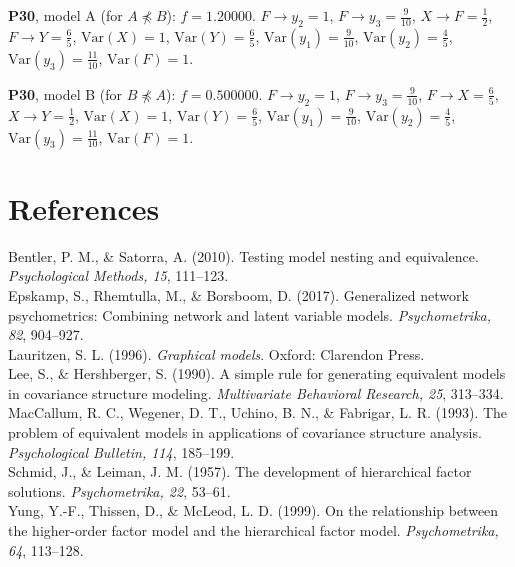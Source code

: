 \documentclass[10pt,a4paper]{article}
\newcommand{\nnest}{\not\preceq}
\begin{document}
{\noindent\textbf{P30}, model A (for $A\nnest B$): $f=1.20000$. {\footnotesize $F\to y_{2}=1$, $F\to y_{3}=\tfrac{9}{10}$, $X\to F=\tfrac{1}{2}$, $F\to Y=\tfrac{6}{5}$, $\mathrm{Var}(X)=1$, $\mathrm{Var}(Y)=\tfrac{6}{5}$, $\mathrm{Var}(y_{1})=\tfrac{9}{10}$, $\mathrm{Var}(y_{2})=\tfrac{4}{5}$, $\mathrm{Var}(y_{3})=\tfrac{11}{10}$, $\mathrm{Var}(F)=1$.}\par\smallskip
\noindent\textbf{P30}, model B (for $B\nnest A$): $f=0.500000$. {\footnotesize $F\to y_{2}=1$, $F\to y_{3}=\tfrac{9}{10}$, $F\to X=\tfrac{6}{5}$, $X\to Y=\tfrac{1}{2}$, $\mathrm{Var}(X)=1$, $\mathrm{Var}(Y)=\tfrac{6}{5}$, $\mathrm{Var}(y_{1})=\tfrac{9}{10}$, $\mathrm{Var}(y_{2})=\tfrac{4}{5}$, $\mathrm{Var}(y_{3})=\tfrac{11}{10}$, $\mathrm{Var}(F)=1$.}\par\smallskip
}

\section*{References}
\small
Bentler, P. M., \& Satorra, A. (2010). Testing model nesting and equivalence. \emph{Psychological Methods, 15}, 111--123.\\
Epskamp, S., Rhemtulla, M., \& Borsboom, D. (2017). Generalized network psychometrics: Combining network and latent variable models. \emph{Psychometrika, 82}, 904--927.\\
Lauritzen, S. L. (1996). \emph{Graphical models}. Oxford: Clarendon Press.\\
Lee, S., \& Hershberger, S. (1990). A simple rule for generating equivalent models in covariance structure modeling. \emph{Multivariate Behavioral Research, 25}, 313--334.\\
MacCallum, R. C., Wegener, D. T., Uchino, B. N., \& Fabrigar, L. R. (1993). The problem of equivalent models in applications of covariance structure analysis. \emph{Psychological Bulletin, 114}, 185--199.\\
Schmid, J., \& Leiman, J. M. (1957). The development of hierarchical factor solutions. \emph{Psychometrika, 22}, 53--61.\\
Yung, Y.-F., Thissen, D., \& McLeod, L. D. (1999). On the relationship between the higher-order factor model and the hierarchical factor model. \emph{Psychometrika, 64}, 113--128.
\end{document}
